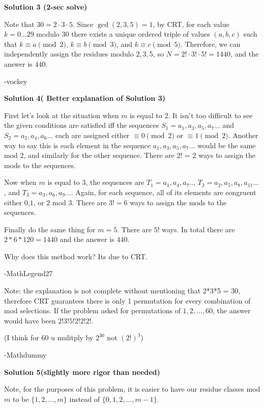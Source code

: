 \begin{enumerate}
\textbf{Solution 3 (2-sec solve)}

Note that $30=2\cdot 3\cdot 5$. Since $\gcd(2, 3, 5)=1$, by CRT, for each value $k=0\ldots 29$ modulo $30$ there exists a unique ordered triple of values $(a, b, c)$ such that $k\equiv a\pmod{2}$, $k\equiv b\pmod{3}$, and $k\equiv c\pmod{5}$. Therefore, we can independently assign the residues modulo $2, 3, 5$, so $N=2!\cdot 3!\cdot 5!=1440$, and the answer is $\boxed{440}$.

 -vockey

 



\textbf{Solution 4( Better explanation of Solution 3)}

First let's look at the situation when $m$ is equal to 2. It isn't too difficult to see the given conditions are satisfied iff the sequences  $S_1 = a_1,a_3,a_5,a_7...$ and $S_2 =a_2,a_4,a_6...$ each are assigned either $\equiv 0 \pmod 2$ or $\equiv 1 \pmod 2$. Another way to say this is each element in the sequence $a_1,a_3,a_5,a_7...$ would be the same mod 2, and similarly for the other sequence. There are 2! = 2 ways to assign the mods to the sequences.

 Now when $m$ is equal to 3, the sequences are $T_1 = a_1, a_4,a_7..$, $T_2 = a_2,a_5,a_8,a_11...$, and $T_3 = a_3,a_6,a_9...$. Again, for each sequence, all of its elements are congruent either $0$,$1$, or $2$ mod $3$. There are $3! = 6$ ways to assign the mods to the sequences.

 Finally do the same thing for $m = 5$. There are $5!$ ways. In total there are $2 * 6*120 = 1440$ and the answer is $\boxed{440}$.

 Why does this method work? Its due to CRT.

 -MathLegend27

 Note: the explanation is not complete without mentioning that 2*3*5 = 30, therefore CRT guarantees there is only 1 permutation for every combination of mod selections. If the problem asked for permutations of ${1,2,...,60}$, the answer would have been $2!3!5!2!2!2!$. 

 (I think for 60 u mulitply by $2^{30}$ not $(2!)^3$)

 -Mathdummy

 



\textbf{Solution 5(slightly more rigor than needed)}

Note, for the purposes of this problem, it is easier to have our residue classes mod \( m \) to be \( \{1, 2, \dots, m\} \) instead of \( \{0, 1, 2, \dots, m-1\} \).


\end{enumerate}
